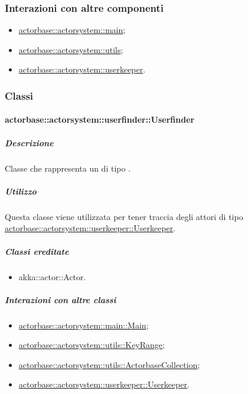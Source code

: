 \documentclass{scalatekids-article}
\begin{document}
\subsubsection{Interazioni con altre componenti}
\begin{itemize}
\item \hyperref[sec:actorbase::actorsystem::main]{actorbase::actorsystem::main};
\item \hyperref[sec:actorbase::actorsystem::utils]{actorbase::actorsystem::utils};
\item \hyperref[sec:actorbase::actorsystem::userkeeper]{actorbase::actorsystem::userkeeper}.
\end{itemize}

\subsubsection{Classi}

\paragraph{actorbase::actorsystem::userfinder::Userfinder}
\label{sec:actorbase::actorsystem::userfinder::Userfinder}

\subparagraph{Descrizione}
Classe che rappresenta un  di tipo .

\subparagraph{Utilizzo}
Questa classe viene utilizzata per tener traccia degli attori di tipo
\hyperref[sec:actorbase::actorsystem::userkeeper::Userkeeper]{actorbase::actorsystem::userkeeper::Userkeeper}.

\subparagraph{Classi ereditate}
\begin{itemize}
\item akka::actor::Actor.
\end{itemize}

\subparagraph{Interazioni con altre classi}
\begin{itemize}
\item \hyperref[sec:actorbase::actorsystem::main::Main]{actorbase::actorsystem::main::Main};
\item \hyperref[sec:actorbase::actorsystem::utils::KeyRange]{actorbase::actorsystem::utils::KeyRange};
\item \hyperref[sec:actorbase::actorsystem::utils::ActorbaseCollection]{actorbase::actorsystem::utils::ActorbaseCollection};
\item \hyperref[sec:actorbase::actorsystem::userkeeper::Userkeeper]{actorbase::actorsystem::userkeeper::Userkeeper}.
\end{itemize}
\end{document}
